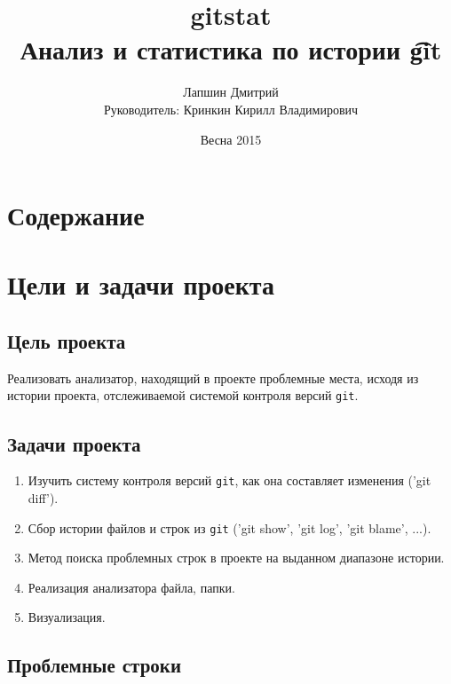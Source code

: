 \documentclass{beamer}
\title[gitstat]{gitstat \\ Анализ и статистика по истории \t{git}}
\author[Лапшин Дмитрий]{Лапшин Дмитрий \\ Руководитель: Кринкин Кирилл Владимирович}
\institute{СПб НИАУ РАН}
\date{Весна 2015}
\makeatletter
\newcommand*{\currentname}{\@currentlabelname}
\def\t{\texttt}
\newcommand{\cimg}[2]{%
	\begin{center}%
		\ifthenelse{\equal{#2}{}}{%
			\texttt{[image: \#1]}
		}{%
			\texttt{[image: \#1]}
		}%
	\end{center}%
}
\makeatother
\begin{document}
\begin{frame}
	\titlepage
\end{frame}

\section{Содержание}

\begin{frame}[t]{\currentname}
	\tableofcontents
\end{frame}

\section{Цели и задачи проекта}

\subsection{Цель проекта}

\begin{frame}[t]{\currentname}
	Реализовать анализатор, находящий в проекте проблемные места, исходя из истории проекта, отслеживаемой системой контроля версий \t{git}.
	\cimg{git.jpg}{0.5}
\end{frame}

\subsection{Задачи проекта}

\begin{frame}[t,fragile]{\currentname}
	\begin{enumerate}[<+->]
	\item
		Изучить систему контроля версий \t{git}, как она составляет изменения (\bash'git diff').
	\item
		Сбор истории файлов и строк из \t{git} (\bash'git show', \bash'git log', \bash'git blame', ...).
	\item
		Метод поиска проблемных строк в проекте на выданном диапазоне истории.
	\item
		Реализация анализатора файла, папки.
	\item
		Визуализация.
	\end{enumerate}
\end{frame}

\subsection{Проблемные строки}
\end{document}
